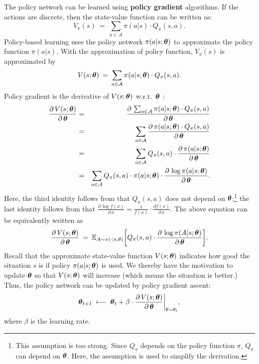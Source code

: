 \documentclass[11pt]{article}
\numberwithin{equation}{section}
\def\AM{{\mathcal A}}
\def\EB{{\mathbb E}}
\def\tha{\mbox{\boldmath$\theta$\unboldmath}}
\begin{document}
The policy network can be learned using \textbf{policy gradient} algorithms.
If the actions are discrete, then the state-value function can be written as:
\begin{equation} \label{eq:state_value}
    V_\pi (s ) \: = \: \sum_{a \in \AM} \pi (a | s) \cdot Q_\pi  (s, a)  .
\end{equation}
Policy-based learning uses the policy network $\pi (a | s; \tha )$ to approximate the policy function $\pi (a | s)$.
With the approximation of policy function, $V_\pi (s )$ is approximated by
\begin{equation*}
    V (s ; \tha ) \: = \: \sum_{a \in \AM} \pi (a | s; \tha ) \cdot Q_\pi  (s, a)  .
\end{equation*}
Policy gradient is the derivative of $ V (s ; \tha )$ w.r.t.\ $\tha $ \cite{sutton2000policy}:
\begin{eqnarray*}
    \frac{\partial \, V (s ; \tha )}{\partial \, \tha }
    & = & \frac{\partial \, \sum_{a \in \AM} \pi (a | s; \tha ) \cdot Q_\pi  (s, a)  }{\partial \, \tha } \\
    & = & \sum_{a \in \AM} \frac{\partial \,  \pi (a | s; \tha ) \cdot Q_\pi  (s, a)  }{\partial \, \tha } \\
    & = & \sum_{a \in \AM}  Q_\pi  (s, a)  \cdot \frac{\partial \,  \pi (a | s; \tha )  }{\partial \, \tha } \\
    & = & \sum_{a \in \AM}  Q_\pi  (s, a) \cdot \pi (a | s; \tha )  \cdot \frac{\partial \,  \log \pi (a | s; \tha )  }{\partial \, \tha } .
\end{eqnarray*}
Here, the third identity follows from that $Q_\pi  (s, a)$ does not depend on $\tha$;\footnote{This assumption is too strong. Since $Q_\pi$ depends on the policy function $\pi$, $Q_{\pi}$ can depend on $\tha$. Here, the assumption is used to simplify the derivation.}
the last identity follows from that $\frac{\partial \, \log f (x)}{\partial \, x} = \frac{1}{f (x)}\cdot \frac{\partial f(x)}{\partial \, x}$.
The above equation can be equivalently written as
\begin{equation} \label{eqn:policy_grad}
    \frac{\partial \, V (s ; \tha )}{\partial \, \tha }
    \: = \: \EB_{A \sim \pi (\cdot | s , \theta )} \bigg[  Q_\pi  (s, a)  \cdot \frac{\partial \,  \log \pi (A | s; \tha )  }{\partial \, \tha }  \bigg] .
\end{equation}
Recall that the approximate state-value function $V (s ; \tha )$ indicates how good the situation $s$ is if policy $\pi (a | s; \tha )$ is used.
We thereby have the motivation to update $\tha$ so that $V (s ; \tha )$ will increase (which means the situation is better.)
Thus, the policy network can be updated by policy gradient ascent:
\begin{equation*}
    \tha_{t+1} \: \longleftarrow \: \tha_t + \beta \cdot \frac{\partial \, V (s ; \tha )}{\partial \, \tha } \bigg|_{\theta = \theta_{t}} ,
\end{equation*}
where $\beta$ is the learning rate.
\end{document}

